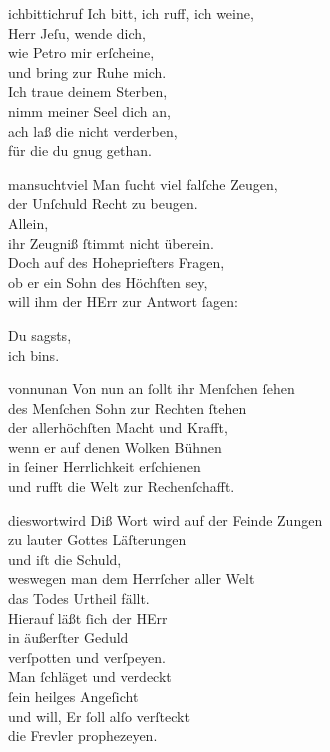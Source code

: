 \documentclass[tocstyle=ref-genre]{ees}
\begin{document}
{\begin{movement}{ichbittichruf}
  \voice[Coro]
  Ich bitt, ich ruff, ich weine,\\
  Herr Jeſu, wende dich,\\
  wie Petro mir erſcheine,\\
  und bring zur Ruhe mich.\\
  Ich traue deinem Sterben,\\
  nimm meiner Seel dich an,\\
  ach laß die nicht verderben,\\
  für die du gnug gethan.
\end{movement}

\begin{movement}{mansuchtviel}
  Man ſucht viel falſche Zeugen,\\
  der Unſchuld Recht zu beugen.\\
  Allein,\\
  ihr Zeugniß ſtimmt nicht überein.\\
  Doch auf des Hoheprieſters Fragen,\\
  ob er ein Sohn des Höchſten sey,\\
  will ihm der HErr zur Antwort ſagen:

  Du sagsts,\\
  ich bins.
\end{movement}

\begin{movement}{vonnunan}
  Von nun an ſollt ihr Menſchen ſehen\\
  des Menſchen Sohn zur Rechten ſtehen\\
  der allerhöchſten Macht und Krafft,\\
  wenn er auf denen Wolken Bühnen\\
  in ſeiner Herrlichkeit erſchienen\\
  und rufft die Welt zur Rechenſchafft.
\end{movement}

\begin{movement}{dieswortwird}
  Diß Wort wird auf der Feinde Zungen\\
  zu lauter Gottes Läſterungen\\
  und iſt die Schuld,\\
  weswegen man dem Herrſcher aller Welt\\
  das Todes Urtheil fällt.\\
  Hierauf läßt ſich der HErr\\
  in äußerſter Geduld\\
  verſpotten und verſpeyen.\\
  Man ſchläget und verdeckt\\
  ſein heilges Angeſicht\\
  und will, Er ſoll alſo verſteckt\\
  die Frevler prophezeyen.


\end{movement}}
\end{document}

